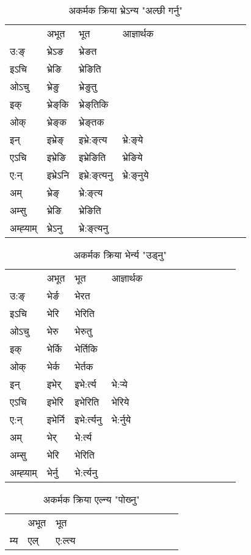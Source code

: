 \begin{table}[H]
\label{eŋ.vi} \centering
\caption{अकर्मक क्रिया  भ्रेऽन्य  "अल्छी गर्नु"  }
\begin{tabular}{l|l|l|l|l|l|l|l|l|l|l|l|l}  \toprule
&अभूत & भूत & आज्ञार्थक \\ 
उ:ङ्‌ &भ्रेऽङ &भ्रेङत \\ 
इऽचि &भ्रेङि &भ्रेङिति   \\ 
ओऽचु &भ्रेङु &भ्रेङुतु   \\ 
इक् &भ्रेङ्‌कि &भ्रेङ्‌तिकि   \\ 
ओक् &भ्रेङ्‌क &भ्रेङ्‌तक   \\ 
इन् & इभ्रेङ्‌ & इभ्रे:ङ्‌त्य &भ्रे:ङ्‌ये  \\ 
एऽचि & इभ्रेङि & इभ्रेङिति &भ्रेङिये    \\ 
ए:न् & इभ्रेऽनि  & इभ्रे:ङ्‌त्यनु &भ्रे:ङ्‌नुये  \\ 
अम् & भ्रेङ्‌ & भ्रे:ङ्‌त्य   \\ 
अम्सु & भ्रेङि & भ्रेङिति   \\ 
अम्ह्‍याम् & भ्रेऽनु  & भ्रे:ङ्‌त्यनु \\ 
\bottomrule
\end{tabular}
\end{table}


\begin{table}[H]
\label{er.vi} \centering
\caption{अकर्मक क्रिया  भेर्न्य  "उड्नु"  }
\begin{tabular}{l|l|l|l|l|l|l|l|l|l|l|l|l}  \toprule
&अभूत & भूत & आज्ञार्थक \\ 
उ:ङ्‌ &भेर्ङ &भेरत \\ 
इऽचि &भेरि &भेरिति   \\ 
ओऽचु &भेरु &भेरुतु   \\ 
इक् &भेर्कि &भेर्तिकि   \\ 
ओक् &भेर्क &भेर्तक   \\ 
इन् & इभेर् & इभे:र्त्य &भे:र्‍ये  \\ 
एऽचि & इभेरि & इभेरिति &भेरिये    \\ 
ए:न् & इभेर्नि  & इभे:र्त्यनु &भे:र्नुये  \\ 
अम् & भेर् & भे:र्त्य   \\ 
अम्सु & भेरि & भेरिति   \\ 
अम्ह्‍याम् & भेर्नु  & भे:र्त्यनु \\ 
\bottomrule
\end{tabular}
\end{table}


\begin{table}[H]
\label{el.vi} \centering
\caption{अकर्मक क्रिया  एल्न्य  "पोख्‍नु"  }
\begin{tabular}{l|l|l|l|l|l|l|l|l|l|l|l|l}  \toprule
&अभूत & भूत   \\ 
म्य & एल् & ए:ल्त्य   \\ 
\bottomrule
\end{tabular}
\end{table}



